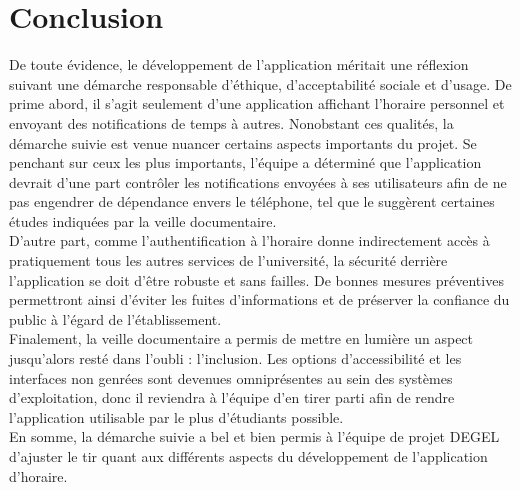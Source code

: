 \section{Conclusion}
De toute évidence, le développement de l'application méritait une réflexion suivant une démarche responsable d'éthique, d'acceptabilité sociale et d'usage. De prime abord, il s'agit seulement d'une application affichant l'horaire personnel et envoyant des notifications de temps à autres. Nonobstant ces qualités, la démarche suivie est venue nuancer certains aspects importants du projet. Se penchant sur ceux les plus importants, l'équipe a déterminé que l'application devrait d'une part contrôler les notifications envoyées à ses utilisateurs afin de ne pas engendrer de dépendance envers le téléphone, tel que le suggèrent certaines études indiquées par la veille documentaire. \\

D'autre part, comme l'authentification à l'horaire donne indirectement accès à pratiquement tous les autres services de l'université, la sécurité derrière l'application se doit d'être robuste et sans failles. De bonnes mesures préventives permettront ainsi d'éviter les fuites d'informations et de préserver la confiance du public à l'égard de l'établissement. \\

Finalement, la veille documentaire a permis de mettre en lumière un aspect jusqu'alors resté dans l'oubli : l'inclusion. Les options d'accessibilité et les interfaces non genrées sont devenues omniprésentes au sein des systèmes d'exploitation, donc il reviendra à l'équipe d'en tirer parti afin de rendre l'application utilisable par le plus d'étudiants possible. \\

En somme, la démarche suivie a bel et bien permis à l'équipe de projet DEGEL d'ajuster le tir quant aux différents aspects du développement de l'application d'horaire. 

